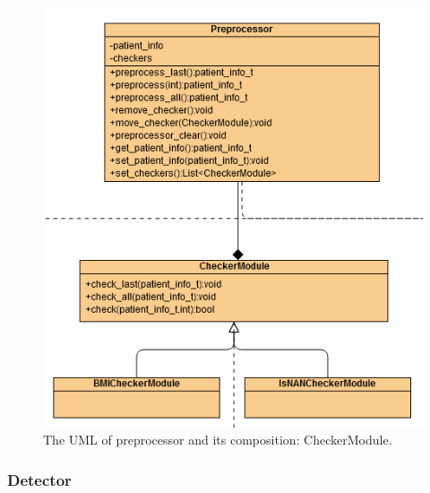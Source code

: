 \documentclass{article}
\begin{document}
\begin{figure}[h]
  \centering
  \includegraphics[scale = 0.35]{asset/preprocessor_and_detector/PRE_preprocessor.png}
  \caption{The UML of preprocessor and its composition: CheckerModule.}
  \label{fig:pre_preprocessor}
\end{figure}

\subsubsection*{Detector}
\end{document}
